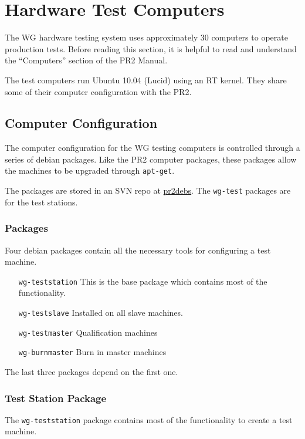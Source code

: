 \documentclass[11pt]{report}
\begin{document}
\chapter{Hardware Test Computers}

The WG hardware testing system uses approximately 30 computers to operate production tests. Before reading this section, it is helpful to read and understand the ``Computers'' section of the PR2 Manual.

The test computers run Ubuntu 10.04 (Lucid) using an RT kernel. They share some of their computer configuration with the PR2.

\section{Computer Configuration}

The computer configuration for the WG testing computers is controlled through a series of debian packages. Like the PR2 computer packages, these packages allow the machines to be upgraded through \texttt{apt-get}.

The packages are stored in an SVN repo at \href{https://code.ros.org/svn/pr2debs/trunk}{pr2debs}. The \texttt{wg-test} packages are for the test stations.

\subsection{Packages}

Four debian packages contain all the necessary tools for configuring a test machine. 

\begin{itemize}
\item [\texttt{wg-teststation}] This is the base package which contains most of the functionality.
\item [\texttt{wg-testslave}] Installed on all slave machines.
\item [\texttt{wg-testmaster}] Qualification machines
\item [\texttt{wg-burnmaster}] Burn in master machines
\end{itemize}

The last three packages depend on the first one. 

\subsection{Test Station Package}

The \texttt{wg-teststation} package contains most of the functionality to create a test machine.
\end{document}
